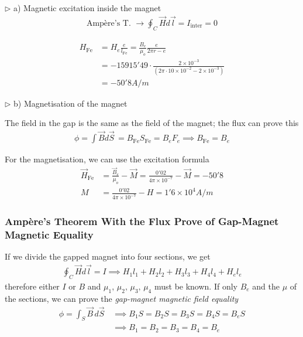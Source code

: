 \documentclass[a4paper]{article}
\begin{document}
$\triangleright$ a) Magnetic excitation inside the magnet
\begin{align}
\text{Ampère's T. }\to \oint_{C}\vec{H}d\vec{l}=I_{\text{inter}} =0
\end{align}
\vspace{1ex}\vspace{1ex}

\begin{align}
H_{\text{Fe}}&=H_{e} \frac{e}{l_{\text{Fe}}}=\frac{B_{e}}{\mu_{o}} \frac{e}{2\pi r-e} \\
&=-15915'49\cdot \frac{2\times 10^{-3}}{(2\pi \cdot 10\times 10^{-2}-2\times 10^{-3})} \\
&=\boxed{-50'8 A / m}
\end{align}

$\triangleright$ b) Magnetisation of the magnet

The field in the gap is the same as the field of the magnet; the flux can prove this
\begin{align}
\phi=\int \vec{B}d\vec{S}\, =B_{\text{Fe}}S_{\text{Fe}}=B_{e}F_{e}\implies B_{\text{Fe}}=B_{e}
\end{align}

For the magnetisation, we can use the excitation formula
\begin{align}
\vec{H}_{\text{Fe}}&=\frac{\vec{B}_{e}}{\mu_{o}}-\vec{M} =\frac{0'02}{4\pi \times 10^{-7}}-\vec{M}=-50'8 \\
M&=\frac{0'02}{4\pi \times 10^{-7}} -H=\boxed{1'6\times 10^{4}A / m}
\end{align}
\subsubsection{Ampère's Theorem With the Flux Prove of Gap-Magnet Magnetic Equality}
\setcounter{equation}{0}
If we divide the gapped magnet into four sections, we get
\begin{align}
\oint_{C}\vec{H}d\vec{l}=I\implies H_{1}l_{1}+H_{2}l_{2}+H_{3}l_{3}+H_{4}l_{4}+H_{e}l_{e}
\end{align}
therefore either $I$ or $B$ and $\mu_{1},\,\mu_{2},\,\mu_{3},\,\mu_{4}$ must be known. If only $B_{e}$ and the $\mu$ of the sections, we can prove the \textit{gap-magnet magnetic field equality}
\begin{align}
\phi=\int _{S}\vec{B} \, d\vec{S}\, &\implies B_{1}S=B_{2}S=B_{3}S=B_{4}S=B_{e}S \\
&\implies B_{1}=B_{2}=B_{3}=B_{4}=B_{e} 
\end{align}
\end{document}
